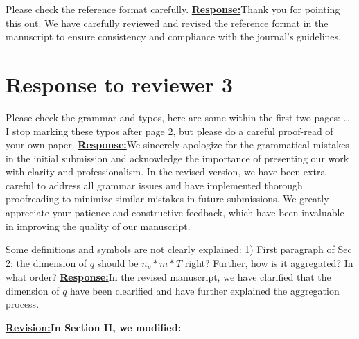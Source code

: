 \documentclass{article}
\newcommand{\re}{\tcblower \underline{\textbf{Response:}}\quad}
\newcommand{\rv}{{\large{\underline{\textbf{Revision:}}}}\quad}
\begin{document}
\begin{cmt}{}{}
	Please check the reference format carefully.
	\re Thank you for pointing this out. We have carefully reviewed and revised the reference format in the manuscript to ensure consistency and compliance with the journal's guidelines.
\end{cmt}
\newpage
\section{Response to reviewer 3} 
\begin{cmt}{}
	Please check the grammar and typos, here are some within the first two pages:
	\dots
	I stop marking these typos after page 2, but please do a careful proof-read of your own paper. 
	\re  We sincerely apologize for the grammatical mistakes in the initial submission and acknowledge the importance of presenting our work with clarity and professionalism. In the revised version, we have been extra careful to address all grammar issues and have implemented thorough proofreading to minimize similar mistakes in future submissions. We greatly appreciate your patience and constructive feedback, which have been invaluable in improving the quality of our manuscript.
\end{cmt}
\begin{cmt}{}{}
	Some definitions and symbols are not clearly explained:
	1) First paragraph of Sec 2: the dimension of $q$ should be $n_p*m*T$
	right? Further, how is it aggregated? In what order?	
	\re In the revised manuscript, we have clarified that the dimension of $q$ have been clearified and have further explained the aggregation process.
\end{cmt}
\rv \textbf{In Section II, we modified:}
\end{document}

